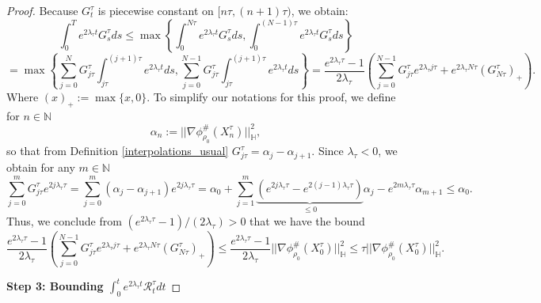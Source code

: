 \documentclass[10pt,a4paper]{amsart}
\newcommand{\N}{\mathbb{N}}
\begin{document}
\begin{proof}
Because $G^{\tau}_t$ is piecewise constant on $[n \tau,(n+1)\tau)$, we obtain:
\[
\int_0^T e^{2 \lambda_{\tau}t}  G^{\tau}_s ds \leq \max \left\{ \int_0^{N \tau}  e^{2 \lambda_{\tau}t}  G^{\tau}_s ds , \int_0^{(N-1)\tau}  e^{2 \lambda_{\tau}t}  G^{\tau}_s ds  \right\} 
\]  
\[
= \max \left\{ \sum_{j=0}^{N} G^{\tau}_{j \tau} \int_{j \tau}^{(j+1)\tau} e^{2 \lambda_{\tau}t}  ds, \sum_{j=0}^{N-1} G^{\tau}_{j \tau} \int_{j \tau}^{(j+1)\tau} e^{2 \lambda_{\tau}t}  ds  \right\} =  \frac{e^{2 \lambda_{\tau} \tau} - 1}{2 \lambda_{\tau}}  \left( \sum_{j=0}^{N-1} G_{j \tau}^{\tau}  e^{2 \lambda_{\tau} j \tau} + e^{2 \lambda_{\tau} N\tau}(G^{\tau}_{N\tau})_{+} \right).  
\] Where $(x)_+ := \max\{x,0\}$. To simplify our notations for this proof, we define for $n \in \N$
\begin{equation}
\alpha_n := ||\nabla \phi^{\#}_{\rho_0}(X_n^{\tau})||^2_{\mathbb{H}}, \label{alpha_def}
\end{equation}
so that from Definition \ref{interpolations_usual} $G^{\tau}_{j \tau} = \alpha_j - \alpha_{j+1}$. Since $\lambda_{\tau} < 0$, we obtain for any $m \in \N$
\[
\sum_{j=0}^{m} G^{\tau}_{j \tau} e^{2 j \lambda_{\tau} \tau} = \sum_{j=0}^{m} (\alpha_j - \alpha_{j+1}) e^{2 j \lambda_{\tau} \tau} = \alpha_0 + \sum_{j=1}^{m} \underbrace{(e^{2 j \lambda_{\tau} \tau} - e^{2 (j-1) \lambda_{\tau} \tau})}_{\leq 0} \alpha_j - e^{2m \lambda_{\tau} \tau} \alpha_{m+1} \leq \alpha_0.
\]  
Thus, we conclude from $(e^{2\lambda_{\tau} \tau} - 1)/(2 \lambda_{\tau}) >0$ that we have the bound
\[ \frac{e^{2 \lambda_{\tau} \tau} - 1}{2 \lambda_{\tau}}  \left( \sum_{j=0}^{N-1} G_{j \tau}^{\tau}  e^{2 \lambda_{\tau} j \tau} + e^{2 \lambda_{\tau} N\tau}(G^{\tau}_{N\tau})_{+} \right) \leq \frac{e^{2 \lambda_{\tau} \tau} - 1}{2 \lambda_{\tau}} ||\nabla \phi^{\#}_{\rho_0}(X_0^{\tau})||^2_{\mathbb{H}} \leq \tau ||\nabla \phi^{\#}_{\rho_0}(X_0^{\tau})||^2_{\mathbb{H}} .
\]

\noindent \textbf{Step 3: Bounding $\int_0^t e^{2 \lambda_{\tau} t} \mathcal{R}_t^{\tau} dt$}


\end{proof}
\end{document}

